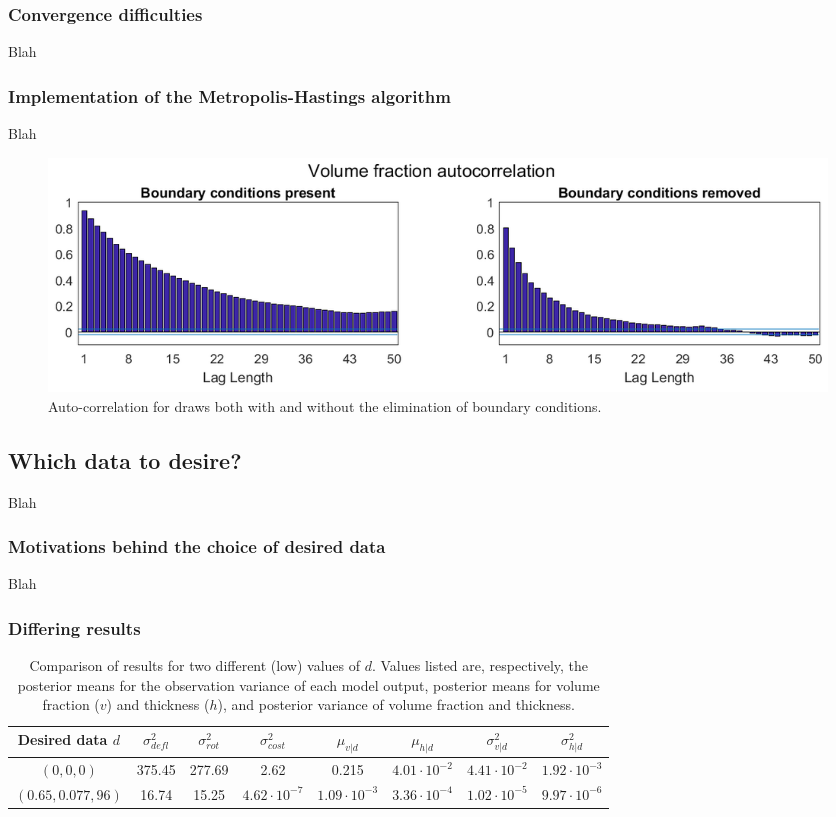 \documentclass{article}
\begin{document}
\subsubsection{Convergence difficulties}
Blah

\subsubsection{Implementation of the Metropolis-Hastings algorithm}
Blah

\begin{figure}
\centering
\includegraphics[width=.9\linewidth]{ACF_bnd_cnds_fig}
\caption{Auto-correlation for draws both with and without the elimination of boundary conditions.}
\end{figure}

\subsection{Which data to desire?}
Blah

\subsubsection{Motivations behind the choice of desired data}
Blah

\subsubsection{Differing results}
\begin{table}[h]
\centering
\begin{tabular}{| c | c  | c  |  c | c  | c | c | c |}
\hline
Desired data $d$ & $\sigma^2_{defl}$ & $\sigma^2_{rot}$ & $\sigma^2_{cost}$ & $\mu_{v|d}$ &
                            $\mu_{h|d}$ & $\sigma^2_{v|d}$ & $\sigma^2_{h|d}$\\
\hline
$(0, 0, 0)$ & 375.45 & 277.69 & 2.62 & 0.215 & $4.01 \cdot 10^{-2}$&
	$4.41\cdot 10^{-2}$ & $1.92 \cdot 10^{-3}$\\
$(0.65, 0.077, 96)$ & 16.74 & 15.25 & $4.62 \cdot 10^{-7}$ &
	$1.09 \cdot 10^{-3}$ & $3.36 \cdot10^{-4}$ &
	$1.02 \cdot 10^{-5}$ & $9.97 \cdot 10^{-6}$\\
\hline
\end{tabular}
\caption{Comparison of results for two different (low) values of $d$. Values listed are, respectively, the posterior means for the observation variance of each model output, posterior means for volume fraction ($v$) and thickness ($h$), and posterior variance of volume fraction and thickness.}
\label{table:d_comp}
\end{table}
\end{document}
